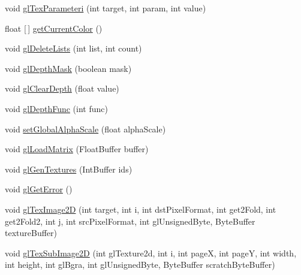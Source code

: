 \begin{DoxyCompactItemize}
\item 
void \mbox{\hyperlink{interfaceorg_1_1newdawn_1_1slick_1_1opengl_1_1renderer_1_1_s_g_l_a99abf6a580aac95c599916a61a4933d4}{gl\+Tex\+Parameteri}} (int target, int param, int value)
\item 
float \mbox{[}$\,$\mbox{]} \mbox{\hyperlink{interfaceorg_1_1newdawn_1_1slick_1_1opengl_1_1renderer_1_1_s_g_l_a212dd49f0deb91e38d917b5702704863}{get\+Current\+Color}} ()
\item 
void \mbox{\hyperlink{interfaceorg_1_1newdawn_1_1slick_1_1opengl_1_1renderer_1_1_s_g_l_a06daf35b442a76f8d6ee62ae413fdd21}{gl\+Delete\+Lists}} (int list, int count)
\item 
void \mbox{\hyperlink{interfaceorg_1_1newdawn_1_1slick_1_1opengl_1_1renderer_1_1_s_g_l_a38dbc27d7cec53cf04ff1d98fd8c15e0}{gl\+Depth\+Mask}} (boolean mask)
\item 
void \mbox{\hyperlink{interfaceorg_1_1newdawn_1_1slick_1_1opengl_1_1renderer_1_1_s_g_l_ab485cf2f4c743772ed5d24a66d7c1af3}{gl\+Clear\+Depth}} (float value)
\item 
void \mbox{\hyperlink{interfaceorg_1_1newdawn_1_1slick_1_1opengl_1_1renderer_1_1_s_g_l_a3704d17846e7513cc280e6275c73ace9}{gl\+Depth\+Func}} (int func)
\item 
void \mbox{\hyperlink{interfaceorg_1_1newdawn_1_1slick_1_1opengl_1_1renderer_1_1_s_g_l_a83549f052fb613b42b147eec5b04e079}{set\+Global\+Alpha\+Scale}} (float alpha\+Scale)
\item 
void \mbox{\hyperlink{interfaceorg_1_1newdawn_1_1slick_1_1opengl_1_1renderer_1_1_s_g_l_a41baff345ccbf53de61ebb3c77e02914}{gl\+Load\+Matrix}} (Float\+Buffer buffer)
\item 
void \mbox{\hyperlink{interfaceorg_1_1newdawn_1_1slick_1_1opengl_1_1renderer_1_1_s_g_l_ab3f3f950cf59599784f17a0d19667829}{gl\+Gen\+Textures}} (Int\+Buffer ids)
\item 
void \mbox{\hyperlink{interfaceorg_1_1newdawn_1_1slick_1_1opengl_1_1renderer_1_1_s_g_l_ad629cdbc2f5bd7148fad9c93b778ff47}{gl\+Get\+Error}} ()
\item 
void \mbox{\hyperlink{interfaceorg_1_1newdawn_1_1slick_1_1opengl_1_1renderer_1_1_s_g_l_ac54bd1b95351cf7ed72830324f256e2e}{gl\+Tex\+Image2D}} (int target, int i, int dst\+Pixel\+Format, int get2\+Fold, int get2\+Fold2, int j, int src\+Pixel\+Format, int gl\+Unsigned\+Byte, Byte\+Buffer texture\+Buffer)
\item 
void \mbox{\hyperlink{interfaceorg_1_1newdawn_1_1slick_1_1opengl_1_1renderer_1_1_s_g_l_a0c94360a9a5a4d66cd52b21d181c8987}{gl\+Tex\+Sub\+Image2D}} (int gl\+Texture2d, int i, int pageX, int pageY, int width, int height, int gl\+Bgra, int gl\+Unsigned\+Byte, Byte\+Buffer scratch\+Byte\+Buffer)

\end{DoxyCompactItemize}
